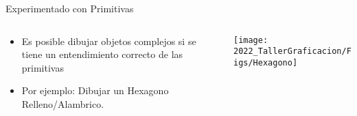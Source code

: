 \begin{frame}{Experimentado con Primitivas}
\begin{columns}
\begin{column}{0.5\textwidth}
\begin{itemize}
\item Es posible dibujar objetos complejos si se tiene un entendimiento correcto de las primitivas 
\item Por ejemplo: Dibujar un Hexagono Relleno/Alambrico. 
\end{itemize}
\end{column}
\begin{column}{0.5\textwidth}
\begin{center}
 \texttt{[image: 2022\_TallerGraficacion/Figs/Hexagono]}
 \end{center}
\end{column}
\end{columns}

\end{frame}







